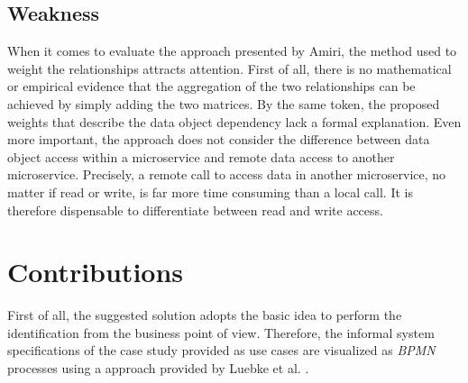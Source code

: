 \subsection{Weakness}
When it comes to evaluate the approach presented by Amiri, the method used to weight the relationships attracts attention. First of all, there is no mathematical or empirical evidence that the aggregation of the two relationships can be achieved by simply adding the two matrices. By the same token, the proposed weights that describe the data object dependency lack a formal explanation. Even more important, the approach does not consider the difference between data object access within a microservice and remote data access to another microservice. Precisely, a remote call to access data in another microservice, no matter if read or write, is far more time consuming than a local call. It is therefore dispensable to differentiate between read and write access. \\
 

\section{Contributions}
\label{sec:solutionOverview:Contributions}
First of all, the suggested solution adopts the basic idea to perform the identification from the business point of view. Therefore, the informal system specifications of the case study provided as use cases are visualized as \textit{BPMN} processes using a approach provided by Luebke et al. \cite{Lubke}.







